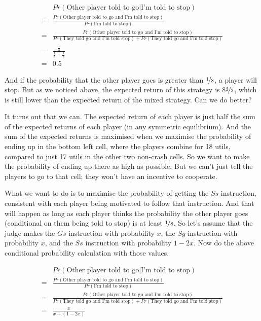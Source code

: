 \documentclass[
  11pt,
  letterpaper,
]{scrbook}
\begin{document}
\begin{align*}
&Pr(\text{Other player told to go}|\text{I'm told to stop}) \\
= &\frac{Pr(\text{Other player told to go and I'm told to stop})}{Pr(\text{I'm told to stop})} \\
= &\frac{Pr(\text{Other player told to go and I'm told to stop})}{Pr(\text{They told go and I'm told stop}) + Pr(\text{They told go and I'm told stop})} \\
= &\frac{\frac{1}{3}}{\frac{1}{3} + \frac{1}{3}} \\
= &0.5
\end{align*}

And if the probability that the other player goes is greater than
\(\nicefrac{1}{8}\), a player will stop. But as we noticed above, the
expected return of this strategy is 8\(\nicefrac{2}{3}\), which is still
lower than the expected return of the mixed strategy. Can we do better?

It turns out that we can. The expected return of each player is just
half the sum of the expected returns of each player (in any symmetric
equilibrium). And the sum of the expected returns is maximised when we
maximise the probability of ending up in the bottom left cell, where the
players combine for 18 utils, compared to just 17 utils in the other two
non-crash cells. So we want to make the probability of ending up there
as high as possible. But we can't just tell the players to go to that
cell; they won't have an incentive to cooperate.

What we want to do is to maximise the probability of getting the \(Ss\)
instruction, consistent with each player being motivated to follow that
instruction. And that will happen as long as each player thinks the
probability the other player goes (conditional on them being told to
stop) is at least \(\nicefrac{1}{8}\). So let's assume that the judge
makes the \(Gs\) instruction with probability \(x\), the \(Sg\)
instruction with probability \(x\), and the \(Ss\) instruction with
probability \(1 - 2x\). Now do the above conditional probability
calculation with those values.

\begin{align*}
&Pr(\text{Other player told to go}|\text{I'm told to stop}) \\ 
= &\frac{Pr(\text{Other player told to go and I'm told to stop})}{Pr(\text{I'm told to stop})} \\
= &\frac{Pr(\text{Other player told to go and I'm told to stop})}{Pr(\text{They told go and I'm told stop}) + Pr(\text{They told go and I'm told stop})} \\
= &\frac{x}{x + (1-2x)}
\end{align*}
\end{document}
